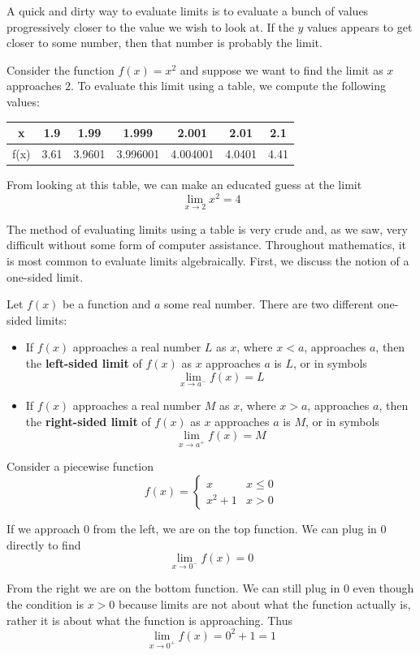 A quick and dirty way to evaluate limits is to evaluate a bunch of values progressively closer to the value we wish to look at. If the $y$ values appears to get closer to some number, then that number is probably the limit.

\begin{example}

Consider the function $f(x) = x^2$ and suppose we want to find the limit as $x$ approaches $2$. To evaluate this limit using a table, we compute the following values:

\begin{center}
\begin{tabular}{|c|c|c|c|c|c|c|}
\hline 
x & 1.9 & 1.99 & 1.999 & 2.001 & 2.01 & 2.1 \\ 
\hline 
f(x) & 3.61 & 3.9601 & 3.996001 & 4.004001 & 4.0401 & 4.41 \\ 
\hline 
\end{tabular} 
\end{center}

From looking at this table, we can make an educated guess at the limit
\[ \lim_{x \to 2} x^2 = 4 \]

\end{example}

The method of evaluating limits using a table is very crude and, as we saw, very difficult without some form of computer assistance. Throughout mathematics, it is most common to evaluate limits algebraically. First, we discuss the notion of a one-sided limit.

\newpage 
\begin{definition}
Let $f(x)$ be a function and $a$ some real number. There are two different one-sided limits:
\begin{itemize}
	\item If $f(x)$ approaches a real number $L$ as $x$, where $x < a$, approaches $a$, then the \textbf{left-sided limit} of $f(x)$ as $x$ approaches $a$ is $L$, or in symbols
	\[ \lim_{x \to a^-} f(x) = L \]
	\item If $f(x)$ approaches a real number $M$ as $x$, where $x > a$, approaches $a$, then the \textbf{right-sided limit} of $f(x)$ as $x$ approaches $a$ is $M$, or in symbols
	\[ \lim_{x \to a^+} f(x) = M \]
\end{itemize}
\end{definition}

\begin{example}
Consider a piecewise function
\[ f(x) = \begin{cases} 
x & x \leq 0 \\
x^2 + 1 & x > 0
\end{cases} \]

If we approach 0 from the left, we are on the top function. We can plug in 0 directly to find
\[ \lim_{x \to 0^-} f(x) = 0 \]

From the right we are on the bottom function. We can still plug in 0 even though the condition is $x > 0$ because limits are not about what the function actually is, rather it is about what the function is approaching. Thus
\[ \lim_{x \to 0^+} f(x) = 0^2 + 1 = 1 \]

\end{example}

